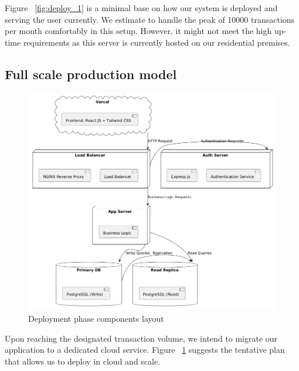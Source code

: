 Figure ~\ref{fig:deploy_1} is a minimal base on how our system is deployed and serving the user currently. We estimate to handle the peak of 10000 transactions per month comfortably in this setup. However, it might not meet the high up-time requirements as this server is currently hosted on our residential premises.

\subsection{Full scale production model}

\begin{figure}[!h]
	\centering
	\includegraphics[width=1\textwidth]{chapters/ch-04/402_deploy_cloud.png} %
	\caption{Deployment phase components layout}
	\label{fig:deploy_2} %
\end{figure}


Upon reaching the designated transaction volume, we intend to migrate our application to a dedicated cloud service. Figure ~\ref{fig:deploy_2} suggests the tentative plan that allows us to deploy in cloud and scale.

\clearpage